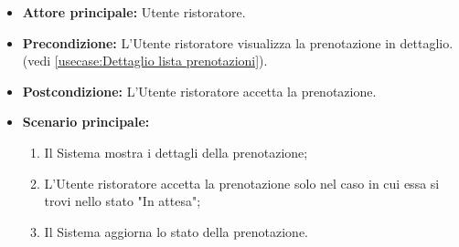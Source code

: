\label{usecase:Accetta prenotazione}
\begin{itemize}
	\item \textbf{Attore principale:} Utente ristoratore.

	\item \textbf{Precondizione:} L'Utente ristoratore visualizza la prenotazione in dettaglio. (vedi \autoref{usecase:Dettaglio lista prenotazioni}).

	\item \textbf{Postcondizione:} L'Utente ristoratore accetta la prenotazione.


	\item \textbf{Scenario principale:}
	      \begin{enumerate}
		      \item Il Sistema mostra i dettagli della prenotazione;
		      \item L'Utente ristoratore accetta la prenotazione solo nel caso in cui essa si trovi nello stato "In attesa";
		      \item Il Sistema aggiorna lo stato della prenotazione.

	      \end{enumerate}
\end{itemize}
